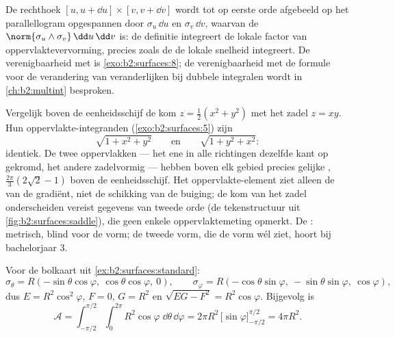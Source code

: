 \begin{remark}
De rechthoek $[u, u + \dd u] \times [v, v + \dd v]$ wordt tot op
eerste orde afgebeeld op het parallellogram opgespannen door
$\sigma_u\,\dd u$ en $\sigma_v\,\dd v$, waarvan de 
$\norm{\sigma_u \wedge \sigma_v}\,\dd u\,\dd v$ is: de definitie
integreert de lokale factor van oppervlaktevervorming, precies
zoals de  de lokale snelheid integreert. De
verenigbaarheid met  is
\cref{exo:b2:surfaces:8}; de verenigbaarheid met de formule voor de
verandering van veranderlijken bij dubbele integralen wordt in
\cref{ch:b2:multint} besproken.
\end{remark}

\begin{example}\label{ex:b2:surfaces:samearea}
Vergelijk boven de eenheidsschijf de kom $z = \frac12(x^2 + y^2)$
met het zadel $z = xy$. Hun oppervlakte-integranden
(\cref{exo:b2:surfaces:5}) zijn
\[
\sqrt{1 + x^2 + y^2}
\qquad\text{en}\qquad
\sqrt{1 + y^2 + x^2} :
\]
identiek. De twee oppervlakken --- het ene in alle richtingen
dezelfde kant op gekromd, het andere zadelvormig --- hebben boven
elk gebied precies gelijke , $\frac{2\pi}3(2\sqrt2 -
1)$ boven de eenheidsschijf. Het oppervlakte-element ziet alleen de
\emph{} van de gradiënt, niet de schikking van de buiging;
de kom van het zadel onderscheiden vereist gegevens van tweede orde
(de tekenstructuur uit \cref{fig:b2:surfaces:saddle}), die geen
enkele oppervlaktemeting opmerkt. De :
metrisch, blind voor de vorm; de tweede vorm, die de vorm wél ziet,
hoort bij bachelorjaar 3.
\end{example}

\begin{example}\label{ex:b2:surfaces:spherearea}
Voor de bolkaart uit \cref{ex:b2:surfaces:standard}:
\[
\sigma_\theta = R(-\sin\theta\cos\varphi,\
\cos\theta\cos\varphi,\ 0),
\qquad
\sigma_\varphi = R(-\cos\theta\sin\varphi,\
-\sin\theta\sin\varphi,\ \cos\varphi),
\]
dus $E = R^2\cos^2\varphi$, $F = 0$, $G = R^2$ en $\sqrt{EG - F^2}
= R^2\cos\varphi$. Bijgevolg is
\[
\mathcal{A}
= \int_{-\pi/2}^{\pi/2}\!\!\int_0^{2\pi}
R^2\cos\varphi\;\dd\theta\,\dd\varphi
= 2\pi R^2\,\bigl[\sin\varphi\bigr]_{-\pi/2}^{\pi/2}
= \boxed{4\pi R^2} .
\]
\end{example}

